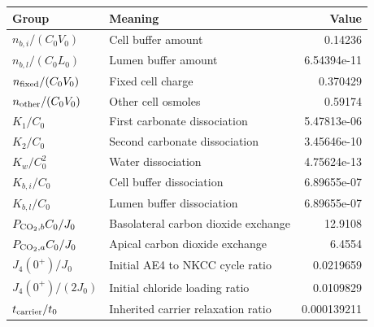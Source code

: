 \begin{tabular}{llr}
\toprule
Group & Meaning & Value \\
\midrule
$n_{b,i}/(C_0V_0)$ & Cell buffer amount & 0.14236 \\
$n_{b,l}/(C_0L_0)$ & Lumen buffer amount & 6.54394e-11 \\
$n_{\rm fixed}/(C_0V_0)$ & Fixed cell charge & 0.370429 \\
$n_{\rm other}/(C_0V_0)$ & Other cell osmoles & 0.59174 \\
$K_1/C_0$ & First carbonate dissociation & 5.47813e-06 \\
$K_2/C_0$ & Second carbonate dissociation & 3.45646e-10 \\
$K_w/C_0^2$ & Water dissociation & 4.75624e-13 \\
$K_{b,i}/C_0$ & Cell buffer dissociation & 6.89655e-07 \\
$K_{b,l}/C_0$ & Lumen buffer dissociation & 6.89655e-07 \\
$P_{{\rm CO}_2,b}C_0/J_0$ & Basolateral carbon dioxide exchange & 12.9108 \\
$P_{{\rm CO}_2,a}C_0/J_0$ & Apical carbon dioxide exchange & 6.4554 \\
$J_4(0^+)/J_0$ & Initial AE4 to NKCC cycle ratio & 0.0219659 \\
$J_4(0^+)/(2J_0)$ & Initial chloride loading ratio & 0.0109829 \\
$t_{\rm carrier}/t_0$ & Inherited carrier relaxation ratio & 0.000139211 \\
\bottomrule
\end{tabular}
